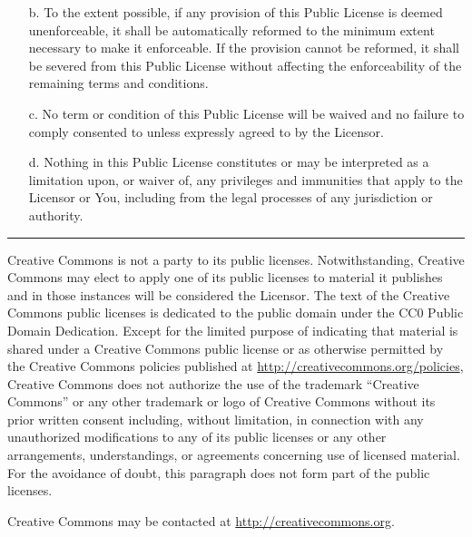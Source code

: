 \begin{scriptsize}
\begin{itemize}
\item[b.] To the extent possible, if any provision of this Public License is
     deemed unenforceable, it shall be automatically reformed to the
     minimum extent necessary to make it enforceable. If the provision
     cannot be reformed, it shall be severed from this Public License
     without affecting the enforceability of the remaining terms and
     conditions.

\item[c.] No term or condition of this Public License will be waived and no
     failure to comply consented to unless expressly agreed to by the
     Licensor.

\item[d.] Nothing in this Public License constitutes or may be interpreted
     as a limitation upon, or waiver of, any privileges and immunities
     that apply to the Licensor or You, including from the legal
     processes of any jurisdiction or authority.\\
\end{itemize}

\hrule

Creative Commons is not a party to its public
licenses. Notwithstanding, Creative Commons may elect to apply one of
its public licenses to material it publishes and in those instances
will be considered the Licensor. The text of the Creative Commons
public licenses is dedicated to the public domain under the CC0 Public
Domain Dedication. Except for the limited purpose of indicating that
material is shared under a Creative Commons public license or as
otherwise permitted by the Creative Commons policies published at
\url{http://creativecommons.org/policies}, Creative Commons does not authorize the
use of the trademark ``Creative Commons'' or any other trademark or logo
of Creative Commons without its prior written consent including,
without limitation, in connection with any unauthorized modifications
to any of its public licenses or any other arrangements,
understandings, or agreements concerning use of licensed material. For
the avoidance of doubt, this paragraph does not form part of the
public licenses.

Creative Commons may be contacted at \url{http://creativecommons.org}.

\end{scriptsize}

